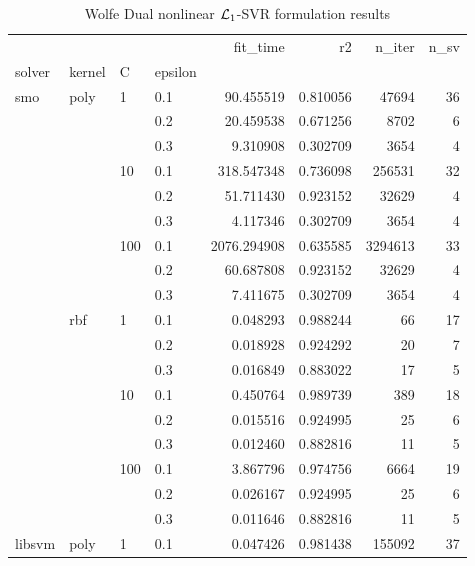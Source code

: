 \begin{table}[H]
\centering
\caption{Wolfe Dual nonlinear $\protect \mathcal{L}_1$-SVR formulation results}
\label{nonlinear_dual_l1_svr_cv_results}
\begin{tabular}{llllrrrr}
\toprule
       &     &     &     &     fit\_time &        r2 &    n\_iter &  n\_sv \\
solver & kernel & C & epsilon &              &           &           &       \\
\midrule
smo & poly & 1   & 0.1 &    90.455519 &  0.810056 &     47694 &    36 \\
       &     &     & 0.2 &    20.459538 &  0.671256 &      8702 &     6 \\
       &     &     & 0.3 &     9.310908 &  0.302709 &      3654 &     4 \\
       &     & 10  & 0.1 &   318.547348 &  0.736098 &    256531 &    32 \\
       &     &     & 0.2 &    51.711430 &  0.923152 &     32629 &     4 \\
       &     &     & 0.3 &     4.117346 &  0.302709 &      3654 &     4 \\
       &     & 100 & 0.1 &  2076.294908 &  0.635585 &   3294613 &    33 \\
       &     &     & 0.2 &    60.687808 &  0.923152 &     32629 &     4 \\
       &     &     & 0.3 &     7.411675 &  0.302709 &      3654 &     4 \\
       & rbf & 1   & 0.1 &     0.048293 &  0.988244 &        66 &    17 \\
       &     &     & 0.2 &     0.018928 &  0.924292 &        20 &     7 \\
       &     &     & 0.3 &     0.016849 &  0.883022 &        17 &     5 \\
       &     & 10  & 0.1 &     0.450764 &  0.989739 &       389 &    18 \\
       &     &     & 0.2 &     0.015516 &  0.924995 &        25 &     6 \\
       &     &     & 0.3 &     0.012460 &  0.882816 &        11 &     5 \\
       &     & 100 & 0.1 &     3.867796 &  0.974756 &      6664 &    19 \\
       &     &     & 0.2 &     0.026167 &  0.924995 &        25 &     6 \\
       &     &     & 0.3 &     0.011646 &  0.882816 &        11 &     5 \\
libsvm & poly & 1   & 0.1 &     0.047426 &  0.981438 &    155092 &    37 \\

\end{tabular}
\end{table}
